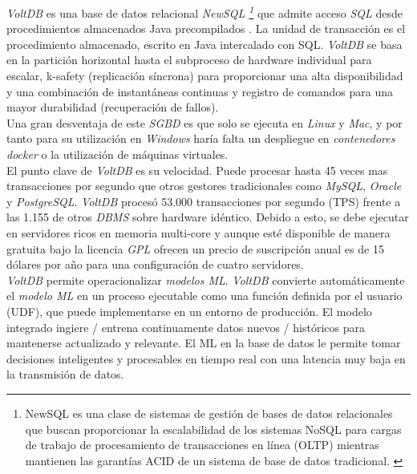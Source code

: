 \documentclass{article}
\begin{document}
\emph{VoltDB} es una base de datos relacional \emph{NewSQL \footnote{NewSQL es una clase de sistemas de gestión de bases de datos relacionales que buscan proporcionar la escalabilidad de los sistemas NoSQL para cargas de trabajo de procesamiento de transacciones en línea (OLTP) mientras mantienen las garantías ACID de un sistema de base de datos tradicional. \cite{VOLT:3}}} que admite acceso \emph{SQL} desde procedimientos almacenados Java precompilados . La unidad de transacción es el procedimiento almacenado, escrito en Java intercalado con SQL. \emph{VoltDB} se basa en la partición horizontal hasta el subproceso de hardware individual para escalar, k-safety (replicación síncrona) para proporcionar una alta disponibilidad y una combinación de instantáneas continuas y registro de comandos para una mayor durabilidad (recuperación de fallos).\cite{VOLT:2}\\

Una gran desventaja de este \emph{SGBD} es que solo se ejecuta en \emph{Linux} y \emph{Mac}, y por tanto para su utilización en \emph{Windows} haría falta un despliegue en \emph{contenedores docker} o la utilización de máquinas virtuales. \cite{VOLT:4} \\

El punto clave de \emph{VoltDB} es su velocidad. Puede procesar hasta 45 veces mas transacciones por segundo que otros gestores tradicionales como \emph{MySQL}, \emph{Oracle} y \emph{PostgreSQL}. \emph{VoltDB} procesó 53.000 transacciones por segundo (TPS) frente a las 1.155 de otros \emph{DBMS} sobre hardware idéntico. \cite{VOLT:5} Debido a esto, se debe ejecutar en servidores ricos en memoria multi-core y aunque esté disponible de manera gratuita bajo la licencia \emph{GPL} ofrecen un precio de suscripción anual es de 15 dólares por año para una configuración de cuatro servidores.\\

\emph{VoltDB} permite operacionalizar \emph{modelos ML}. \emph{VoltDB} convierte automáticamente el \emph{modelo ML} en un proceso ejecutable como una función definida por el usuario (UDF), que puede implementarse en un entorno de producción. El modelo integrado ingiere / entrena continuamente datos nuevos / históricos para mantenerse actualizado y relevante. El ML en la base de datos le permite tomar decisiones inteligentes y procesables en tiempo real con una latencia muy baja en la transmisión de datos. \cite{VOLT:6}\\
\end{document}
